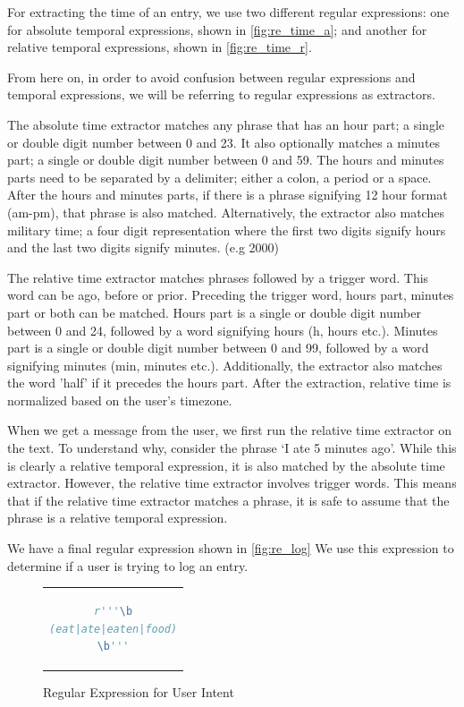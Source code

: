 For extracting the time of an entry, we use two different regular expressions: 
one for absolute temporal expressions, shown in \autoref{fig:re_time_a}; and another for relative temporal expressions, shown in \autoref{fig:re_time_r}.

From here on, in order to avoid confusion between regular expressions and temporal expressions, 
we will be referring to regular expressions as extractors.

The absolute time extractor matches any phrase that has an hour part; a single or double digit number between 0 and 23.
It also optionally matches a minutes part; a single or double digit number between 0 and 59.
The hours and minutes parts need to be separated by a delimiter; either a colon, a period or a space.
After the hours and minutes parts, if there is a phrase signifying 12 hour format (am-pm), that phrase is also matched.
Alternatively, the extractor also matches military time; a four digit representation where the first two digits signify hours and the last two digits signify minutes. (e.g 2000)

The relative time extractor matches phrases followed by a trigger word.
This word can be ago, before or prior.
Preceding the trigger word, hours part, minutes part or both can be matched.
Hours part is a single or double digit number between 0 and 24, followed by a word signifying hours (h, hours etc.).
Minutes part is a single or double digit number between 0 and 99, followed by a word signifying minutes (min, minutes etc.).
Additionally, the extractor also matches the word 'half' if it precedes the hours part.
After the extraction, relative time is normalized based on the user's timezone.

When we get a message from the user, we first run the relative time extractor on the text.
To understand why, consider the phrase `I ate 5 minutes ago'.
While this is clearly a relative temporal expression, it is also matched by the absolute time extractor.
However, the relative time extractor involves trigger words.
This means that if the relative time extractor matches a phrase, it is safe to assume that the phrase is a relative temporal expression.

We have a final regular expression shown in \autoref{fig:re_log}
We use this expression to determine if a user is trying to log an entry.

\begin{figure}[htpb]
  \centering
  \begin{tabular}{c}
  \begin{lstlisting}[language=python]
r'''\b
(eat|ate|eaten|food)
\b'''
  \end{lstlisting}
  \end{tabular}
  \caption[Regular Expression for User Intent]{Regular Expression for User Intent}
  \label{fig:re_log}
\end{figure}

